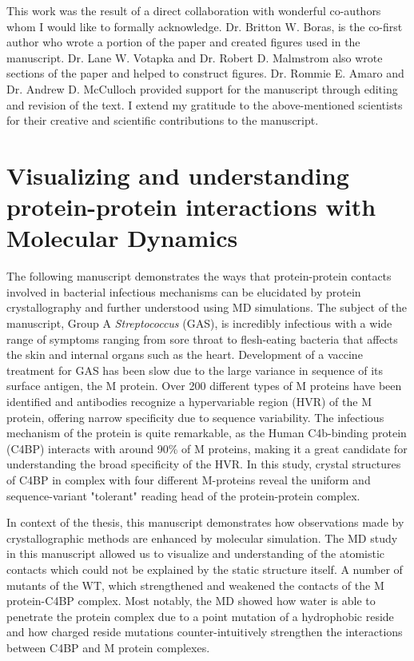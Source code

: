 \documentclass[12pt]{ucsddissertation}
\begin{document}
This work was the result of a direct collaboration with wonderful co-authors whom I would like to formally acknowledge. Dr. Britton W. Boras, is the co-first author who wrote a portion of the paper and created figures used in the manuscript. Dr. Lane W. Votapka and Dr. Robert D. Malmstrom also wrote sections of the paper and helped to construct figures. Dr. Rommie E. Amaro and Dr. Andrew D. McCulloch provided support for the manuscript through editing and revision of the text. I extend my gratitude to the above-mentioned scientists for their creative and scientific contributions to the manuscript. 



\chapter{Visualizing and understanding protein-protein interactions with Molecular Dynamics}\label{cosmo_paper}
\vspace*{-1cm}
The following manuscript demonstrates the ways that protein-protein contacts involved in bacterial infectious mechanisms can be elucidated by protein crystallography and further understood using MD simulations. The subject of the manuscript, Group A \textit{Streptococcus} (GAS), is incredibly infectious with a wide range of symptoms ranging from sore throat to flesh-eating bacteria that affects the skin and internal organs such as the heart. Development of a vaccine treatment for GAS has been slow due to the large variance in sequence of its surface antigen, the M protein. Over 200 different types of M proteins have been identified and antibodies recognize a hypervariable region (HVR) of the M protein, offering narrow specificity due to sequence variability. The infectious mechanism of the protein is quite remarkable, as the Human C4b-binding protein (C4BP) interacts with around 90\% of M proteins, making it a great candidate for understanding the broad specificity of the HVR. In this study, crystal structures of C4BP in complex with four different M-proteins reveal the uniform and sequence-variant "tolerant" reading head of the protein-protein complex. 

In context of the thesis, this manuscript demonstrates how observations made by crystallographic methods are enhanced by molecular simulation. The MD study in this manuscript allowed us to visualize and understanding of the atomistic contacts which could not be explained by the static structure itself.
A number of mutants of the WT, which strengthened and weakened the contacts of the M protein-C4BP complex.  Most notably, the MD showed how water is able to penetrate the protein complex due to a point mutation of a hydrophobic reside and how charged reside mutations counter-intuitively strengthen the interactions between C4BP and M protein complexes.   \\
\end{document}
